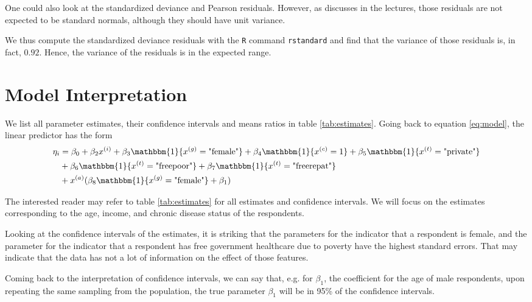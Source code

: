 \documentclass[a4paper,11pt]{article}
\begin{document}
One could also look at the standardized deviance and Pearson residuals. However, as discusses in the lectures, those residuals are not expected to be standard normals, although they should have unit variance.

We thus compute the standardized deviance residuals with the \texttt{R} command \texttt{rstandard} and find that the variance of those residuals is, in fact, $0.92$. Hence, the variance of the residuals is in the expected range.

\section{Model Interpretation}

We list all parameter estimates, their confidence intervals and means ratios in table \ref{tab:estimates}. Going back to equation \ref{eq:model}, the linear predictor has the form
\begin{align}
\eta_i &= \beta_0  +  \beta_2 x^{(i)} + \beta_3 \mathbbm{1}\{x^{(g)} = \text{"female"}\}     +\beta_4\mathbbm{1}\{x^{(c)} = 1\}   + 
 \beta_5\mathbbm{1}\{x^{(t)} = \text{"private"}\}    \\
 &+  \beta_6\mathbbm{1}\{x^{(t)} = \text{"freepoor"}\}  + \beta_7 \mathbbm{1}\{x^{(t)} = \text{"freerepat"}\}  \\
&+   x^{(a)}(\beta_8 \mathbbm{1}\{x^{(g)} = \text{"female"} \} + \beta_1)
\end{align}



The interested reader may refer to table \ref{tab:estimates} for all estimates and confidence intervals. We will focus on the estimates corresponding to the age, income, and chronic disease status of the respondents.

Looking at the confidence intervals of the estimates, it is striking that the parameters for the indicator that a respondent is female, and the parameter for the indicator that a respondent has free government healthcare due to poverty have the highest standard errors. That may indicate that the data has not a lot of information on the effect of those features.

Coming back to the interpretation of confidence intervals, we can say that, e.g. for $\beta_1$, the coefficient for the age of male respondents, upon repeating the same sampling from the population, the true parameter $\beta_1$ will be in 95\% of the confidence intervals.
\end{document}
